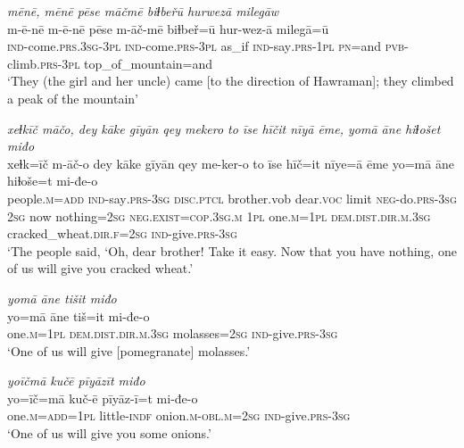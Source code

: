 \ea \label{ŽP.186}
\textit{mēnē, mēnē pēse māčmē biɫbeřū hurwezā milegāw} \\ 
\gll m-ē-nē m-ē-nē pēse m-āč-mē biɫbeř=ū hur-wez-ā milegā=ū \\ 
 \textsc{ind-}come\textsc{.prs}\textsc{.3sg}\textsc{-3pl} \textsc{ind-}come\textsc{.prs}\textsc{-3pl} as\_if \textsc{ind-}say\textsc{.prs}\textsc{-1pl} \textsc{pn}=and \textsc{pvb-}climb\textsc{.prs}\textsc{-3pl} top\_of\_mountain=and \\ 
\glt `They (the girl and her uncle) came [to the direction of Hawraman]; they climbed a peak of the mountain'
\z 
 
\ea \label{ŽP.227}
\textit{xeɫkīč māčo, dey kāke gīyān qey mekero to īse hīčit nīyā ēme, yomā āne hiɫošet miđo} \\ 
\gll xeɫk=īč m-āč-o dey kāke gīyān qey me-ker-o to īse hīč=it nīye=ā ēme yo=mā āne hiɫoše=t mi-đe-o \\ 
 people\textsc{.m}\textsc{=add} \textsc{ind-}say\textsc{.prs}\textsc{-3sg} \textsc{disc.ptcl} brother.vob dear.\textsc{voc} limit \textsc{neg-}do\textsc{.prs}\textsc{-3sg} \textsc{2sg} now nothing\textsc{=\textsc{2sg}} \textsc{\textsc{neg.}exist}\textsc{=cop}\textsc{.3sg}\textsc{.m} \textsc{1pl} one\textsc{.m}\textsc{=1pl} \textsc{dem.dist}\textsc{.dir}\textsc{.m}\textsc{.3sg} cracked\_wheat\textsc{.dir}\textsc{.f}\textsc{=\textsc{2sg}} \textsc{ind-}give\textsc{.prs}\textsc{-3sg} \\ 
\glt `The people said, ‘Oh, dear brother! Take it easy. Now that you have nothing, one of us will give you cracked wheat.'
\z 
 
\ea \label{ŽP.228}
\textit{yomā āne tišit miđo} \\ 
\gll yo=mā āne tiš=it mi-đe-o \\ 
 one\textsc{.m}\textsc{=1pl} \textsc{dem.dist}\textsc{.dir}\textsc{.m}\textsc{.3sg} molasses\textsc{=\textsc{2sg}} \textsc{ind-}give\textsc{.prs}\textsc{-3sg} \\ 
\glt `One of us will give [pomegranate] molasses.'
\z 
 
\ea \label{ŽP.229}
\textit{yoīčmā kučē pīyāzīt miđo} \\ 
\gll yo=īč=mā kuč-ē pīyāz-ī=t mi-đe-o \\ 
 one\textsc{.m}\textsc{=add}\textsc{=1pl} little\textsc{-indf} onion\textsc{.m}\textsc{-obl}\textsc{.m}\textsc{=\textsc{2sg}} \textsc{ind-}give\textsc{.prs}\textsc{-3sg} \\ 
\glt `One of us will give you some onions.'
\z 
 
